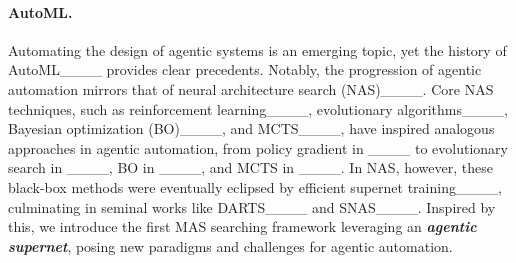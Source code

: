 \vspace{-0.6em}
\paragraph{AutoML.} Automating the design of agentic systems is an emerging topic, yet the history of AutoML____ provides clear precedents. Notably, the progression of agentic automation mirrors that of neural architecture search (NAS)____. Core NAS techniques, such as reinforcement learning____, evolutionary algorithms____, Bayesian optimization (BO)____, and MCTS____, have inspired analogous approaches in agentic automation, from policy gradient in ____ to evolutionary search in ____, BO in ____, and MCTS in ____. In NAS, however, these black-box methods were eventually eclipsed by efficient supernet training____, culminating in seminal works like DARTS____ and SNAS____. Inspired by this, we introduce the first MAS searching framework leveraging an \textit{\textbf{agentic supernet}}, posing new paradigms and challenges for agentic automation.



\vspace{-0.4em}